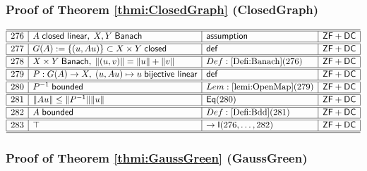 \documentclass[11pt,reqno]{amsart}
\begin{document}
\medskip

\subsubsection*{Proof of Theorem \ref{thmi:ClosedGraph} (\textsf{ClosedGraph})}

\noindent$%
\begin{array}{|r|l|l|l|}
\hline\hline
276 & A\;\mathsf{closed\ linear},\;X,Y\;\mathsf{Banach} & \mathsf{assumption} & \mathsf{ZF+DC} \\ \hline\hline
277 & G(A):=\{(u,Au)\}\subset X\times Y\;\mathsf{closed} & \mathsf{def} & \mathsf{ZF+DC} \\ \hline\hline
278 & X\times Y\;\mathsf{Banach},\;\|(u,v)\|=\|u\|+\|v\| & Def:\ref{Defi:Banach}(276) & \mathsf{ZF+DC} \\ \hline\hline
279 & P:G(A)\to X,\;(u,Au)\mapsto u\;\mathsf{bijective\ linear} & \mathsf{def} & \mathsf{ZF+DC} \\ \hline\hline
280 & P^{-1}\;\mathsf{bounded} & Lem:\ref{lemi:OpenMap}(279) & \mathsf{ZF+DC} \\ \hline\hline
281 & \|Au\|\le\|P^{-1}\|\|u\| & \mathsf{Eq}(280) & \mathsf{ZF+DC} \\ \hline\hline
282 & A\;\mathsf{bounded} & Def:\ref{Defi:Bdd}(281) & \mathsf{ZF+DC} \\ \hline\hline
283 & \top & \to\mathsf{I}(276,\dots,282) & \mathsf{ZF+DC} \\ \hline\hline
\end{array}%
$

\medskip

\subsubsection*{Proof of Theorem \ref{thmi:GaussGreen} (\textsf{GaussGreen})}
\end{document}

